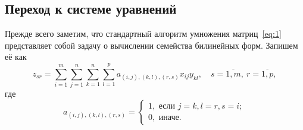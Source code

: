 \documentclass[12pt]{article}
\begin{document}
    \subsection{Переход к системе уравнений}
    Прежде всего заметим, что стандартный алгоритм умножения матриц~\eqref{eq:1} представляет собой задачу о вычислении
    семейства билинейных форм.
    Запишем её как
    \begin{equation}
        z_{sr} = \sum_{i=1}^{m} \sum_{j=1}^{n} \sum_{k=1}^{n} \sum_{l=1}^{p} a_{(i,j),(k,l),(r,s)} x_{ij} y_{kl},
        \quad s = \overline{1, m}, \: r = \overline{1, p} \label{eq:2},
    \end{equation}
    где
    \begin{equation}
        a_{(i,j),(k,l),(r,s)} =
        \begin{cases}
            1,\text{ если } j = k, l = r, s = i;\\
            0, \text{ иначе.}
        \end{cases}\label{eq:3}
    \end{equation}
\end{document}
